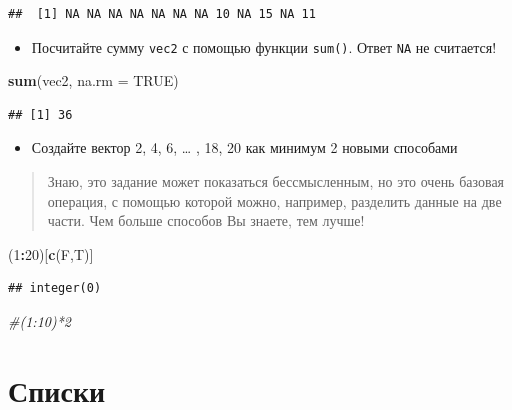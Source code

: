 \documentclass[]{book}
\newenvironment{Shaded}{\begin{snugshade}}{\end{snugshade}}
\newcommand{\CommentTok}[1]{\textcolor[rgb]{0.56,0.35,0.01}{\textit{#1}}}
\newcommand{\DataTypeTok}[1]{\textcolor[rgb]{0.13,0.29,0.53}{#1}}
\newcommand{\DecValTok}[1]{\textcolor[rgb]{0.00,0.00,0.81}{#1}}
\newcommand{\KeywordTok}[1]{\textcolor[rgb]{0.13,0.29,0.53}{\textbf{#1}}}
\newcommand{\NormalTok}[1]{#1}
\newcommand{\OperatorTok}[1]{\textcolor[rgb]{0.81,0.36,0.00}{\textbf{#1}}}
\newcommand{\OtherTok}[1]{\textcolor[rgb]{0.56,0.35,0.01}{#1}}
\providecommand{\tightlist}{%
  \setlength{\itemsep}{0pt}\setlength{\parskip}{0pt}}
\begin{document}
\begin{verbatim}
##  [1] NA NA NA NA NA NA NA 10 NA 15 NA 11
\end{verbatim}

\begin{itemize}
\tightlist
\item
  Посчитайте сумму \texttt{vec2} с помощью функции \texttt{sum()}. Ответ \texttt{NA} не считается!
\end{itemize}

\begin{Shaded}
\begin{Highlighting}[]
\KeywordTok{sum}\NormalTok{(vec2, }\DataTypeTok{na.rm =} \OtherTok{TRUE}\NormalTok{)}
\end{Highlighting}
\end{Shaded}

\begin{verbatim}
## [1] 36
\end{verbatim}

\begin{itemize}
\tightlist
\item
  Создайте вектор 2, 4, 6, \ldots{} , 18, 20 как минимум 2 новыми способами
\end{itemize}

\begin{quote}
Знаю, это задание может показаться бессмысленным, но это очень базовая операция, с помощью которой можно, например, разделить данные на две части. Чем больше способов Вы знаете, тем лучше!
\end{quote}

\begin{Shaded}
\begin{Highlighting}[]
\NormalTok{(}\DecValTok{1}\OperatorTok{:}\DecValTok{20}\NormalTok{)[}\KeywordTok{c}\NormalTok{(F,T)]}
\end{Highlighting}
\end{Shaded}

\begin{verbatim}
## integer(0)
\end{verbatim}

\begin{Shaded}
\begin{Highlighting}[]
\CommentTok{#(1:10)*2}
\end{Highlighting}
\end{Shaded}

\hypertarget{solvlist_ta}{%
\section{Списки}\label{solvlist_ta}}
\end{document}
